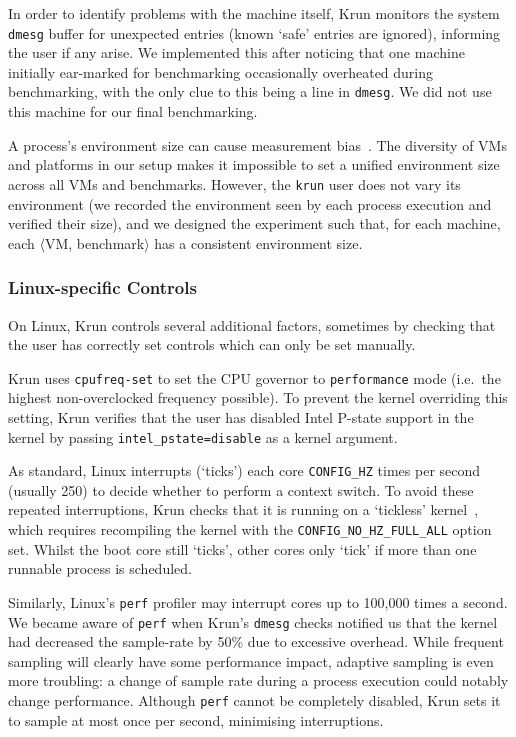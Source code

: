 \documentclass[acmsmall,screen]{acmart}
\newcommand{\krun}{Krun\xspace}
\newcommand{\vmbpair}{$\langle$VM, benchmark$\rangle$\xspace}
\begin{document}
In order to identify problems with the machine itself, \krun monitors the
system \texttt{dmesg} buffer for unexpected entries (known `safe' entries
are ignored), informing the user if any arise. We implemented this after
noticing that one machine initially ear-marked for benchmarking occasionally
overheated during benchmarking, with the only clue to this being a line in \texttt{dmesg}.
We did not use this machine for our final benchmarking.

A process's environment size can cause measurement
bias~\cite{mytkowicz09surprising}. The diversity of VMs and platforms
in our setup makes it impossible to set a unified environment size across all VMs and
benchmarks. However, the \texttt{krun} user does not
vary its environment (we recorded the environment seen by each process
execution and verified their size), and we designed the experiment such that,
for each machine, each \vmbpair has a consistent environment size.


\subsubsection{Linux-specific Controls}

On Linux, \krun controls several additional factors, sometimes by checking that
the user has correctly set controls which can only be set manually.

\krun uses \texttt{cpufreq-set} to set the CPU governor to \texttt{performance} mode
(i.e.~the highest non-overclocked frequency possible).
To prevent the kernel overriding this setting, \krun verifies that the user has disabled
Intel P-state support in the kernel by passing
\texttt{intel\_pstate=disable} as a kernel argument.

As standard, Linux interrupts (`ticks') each core
\texttt{CONFIG\-\_HZ} times per second (usually 250) to
decide whether to perform a context switch. To avoid these repeated
interruptions, \krun checks that it is running on a `tickless'
kernel~\cite{tickless}, which requires recompiling the kernel with the
\texttt{CONFIG\_NO\_HZ\_FULL\_ALL} option set. Whilst the boot core still
`ticks', other cores only `tick' if more than one runnable process is scheduled.

Similarly, Linux's \texttt{perf} profiler may interrupt cores up to 100,000 times a
second. We became aware of \texttt{perf} when \krun's \texttt{dmesg} checks
notified us that the kernel had decreased the sample-rate by
50\% due to excessive overhead. While frequent sampling will clearly have some performance
impact, adaptive sampling is even more troubling: a change of sample
rate during a process execution could notably change performance.
Although \texttt{perf} cannot be completely disabled, \krun sets it to sample at most
once per second, minimising interruptions.
\end{document}
